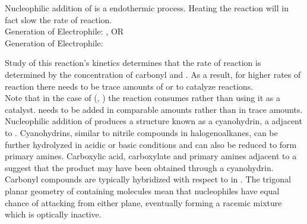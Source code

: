 \documentclass[../main]{subfiles}
\begin{document}
	Nucleophilic addition of  is a endothermic process. Heating the reaction will in fact slow the rate of reaction. \\

	Generation of Electrophile: , OR \\
	Generation of Electrophile:  \\


	Study of this reaction's kinetics determines that the rate of reaction is determined by the concentration of carbonyl and . As a result, for higher rates of reaction there needs to be trace amounts of  or  to catalyze reactions. \\

	Note that in the case of (, ) the reaction consumes  rather than using it as a catalyst.  needs to be added in comparable amounts rather than in trace amounts. \\

	Nucleophilic addition of  produces a structure known as a cyanohydrin,  a  adjacent to . Cyanohydrins, similar to nitrile compounds in halogenoalkanes, can be further hydrolyzed in acidic or basic conditions and can also be reduced to form primary amines. Carboxylic acid, carboxylate and primary amines adjacent to a  suggest that the product may have been obtained through a cyanohydrin. \\

	Carbonyl compounds are typically  hybridized with respect to  in . The trigonal planar geometry of  containing molecules mean that nucleophiles have equal chance of attacking from either plane, eventually forming a racemic mixture which is optically inactive.
\end{document}
